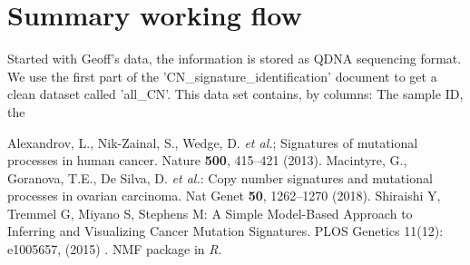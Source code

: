 \documentclass[a4paper]{article}
\begin{document}
 



\section{Summary working flow}
Started with Geoff's data, the information is stored as QDNA sequencing format. We use the first part of the 'CN\_signature\_identification' document to get a clean dataset called 'all\_CN'. This data set contains, by columns: The sample ID, the 

\clearpage
\begin{thebibliography}{9}
	Alexandrov, L., Nik-Zainal, S., Wedge, D. \textit{et al.}; Signatures of mutational processes in human cancer. Nature \textbf{500}, 415–421 (2013). 
	Macintyre, G., Goranova, T.E., De Silva, D. \textit{et al.}: Copy number signatures and mutational processes in ovarian carcinoma. Nat Genet \textbf{50}, 1262–1270 (2018).
	Shiraishi Y, Tremmel G, Miyano S, Stephens M: A Simple Model-Based Approach to Inferring and Visualizing Cancer Mutation Signatures. PLOS Genetics 11(12): e1005657,  (2015) .
	NMF package in \textit{R}.
\end{thebibliography}
\end{document}
